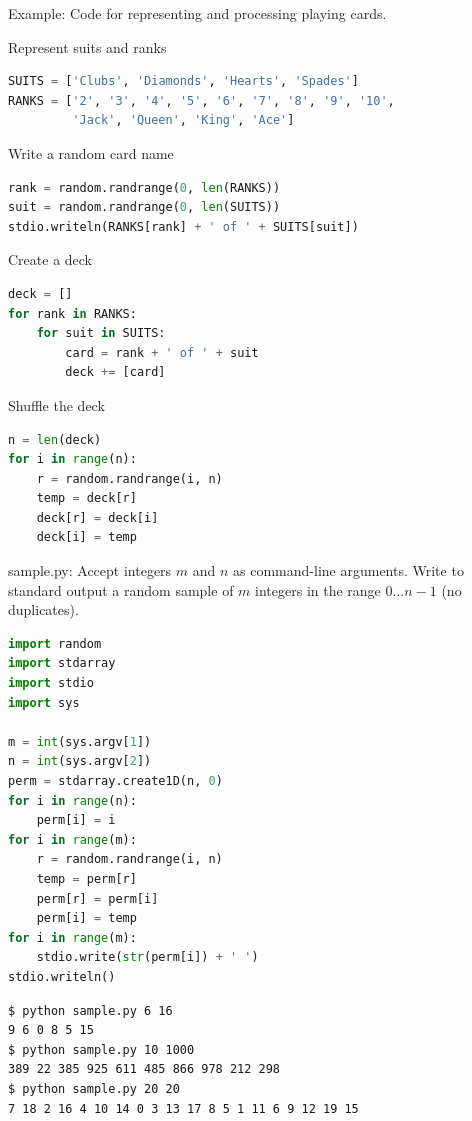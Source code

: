 \documentclass[8pt,a4paper,compress]{beamer}
\begin{document}
\begin{frame}[fragile]
\pause

\begin{framed}
\tiny Example: Code for representing and processing playing cards.
\end{framed}

\pause

Represent suits and ranks
\begin{lstlisting}[language=Python]
SUITS = ['Clubs', 'Diamonds', 'Hearts', 'Spades']
RANKS = ['2', '3', '4', '5', '6', '7', '8', '9', '10', 
         'Jack', 'Queen', 'King', 'Ace']
\end{lstlisting}

\pause

Write a random card name
\begin{lstlisting}[language=Python]
rank = random.randrange(0, len(RANKS))
suit = random.randrange(0, len(SUITS))
stdio.writeln(RANKS[rank] + ' of ' + SUITS[suit])
\end{lstlisting}

\pause

Create a deck
\begin{lstlisting}[language=Python]
deck = []
for rank in RANKS:
    for suit in SUITS:
        card = rank + ' of ' + suit
        deck += [card]
\end{lstlisting}

\pause

Shuffle the deck
\begin{lstlisting}[language=Python]
n = len(deck)
for i in range(n):
    r = random.randrange(i, n)
    temp = deck[r]
    deck[r] = deck[i]
    deck[i] = temp
\end{lstlisting}
\end{frame}

\begin{frame}[fragile]
\pause

\begin{framed}
\tiny sample.py: Accept integers $m$ and $n$ as command-line arguments. Write to standard output a random sample of $m$ integers in the range $0 \dots n-1$ (no duplicates).
\end{framed}

\begin{lstlisting}[language=Python]
import random
import stdarray
import stdio
import sys

m = int(sys.argv[1])
n = int(sys.argv[2])
perm = stdarray.create1D(n, 0)
for i in range(n):
    perm[i] = i
for i in range(m):
    r = random.randrange(i, n)
    temp = perm[r]
    perm[r] = perm[i]
    perm[i] = temp
for i in range(m):
    stdio.write(str(perm[i]) + ' ')
stdio.writeln()
\end{lstlisting}

\pause

\begin{lstlisting}[language={}]
$ python sample.py 6 16
9 6 0 8 5 15 
$ python sample.py 10 1000
389 22 385 925 611 485 866 978 212 298 
$ python sample.py 20 20
7 18 2 16 4 10 14 0 3 13 17 8 5 1 11 6 9 12 19 15 
\end{lstlisting}
\end{frame}
\end{document}
